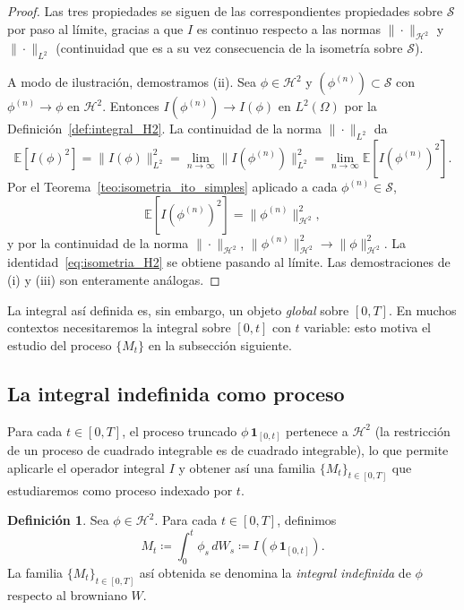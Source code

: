 \documentclass[11pt,a4paper,oneside]{report}
\theoremstyle{plain}
\theoremstyle{definition}
\newtheorem{definicion}[teorema]{Definición}
\theoremstyle{remark}
\newcommand{\E}{\mathbb{E}}
\newcommand{\1}{\mathbf{1}}
\newcommand{\eqdef}{\coloneqq}
\begin{document}
\begin{proof}
Las tres propiedades se siguen de las correspondientes propiedades
sobre $\mathcal{S}$ por paso al límite, gracias a que $I$ es continuo
respecto a las normas $\|\cdot\|_{\mathcal{H}^2}$ y $\|\cdot\|_{L^2}$
(continuidad que es a su vez consecuencia de la isometría sobre
$\mathcal{S}$).

A modo de ilustración, demostramos (ii). Sea $\phi \in \mathcal{H}^2$
y $(\phi^{(n)}) \subset \mathcal{S}$ con $\phi^{(n)} \to \phi$ en
$\mathcal{H}^2$. Entonces $I(\phi^{(n)}) \to I(\phi)$ en $L^2(\Omega)$
por la Definición~\ref{def:integral_H2}. La continuidad de la norma
$\|\cdot\|_{L^2}$ da
\begin{equation*}
  \E[I(\phi)^2]
  = \|I(\phi)\|_{L^2}^2
  = \lim_{n\to\infty} \|I(\phi^{(n)})\|_{L^2}^2
  = \lim_{n\to\infty} \E[I(\phi^{(n)})^2].
\end{equation*}
Por el Teorema~\ref{teo:isometria_ito_simples} aplicado a cada
$\phi^{(n)} \in \mathcal{S}$,
\begin{equation*}
  \E[I(\phi^{(n)})^2] = \|\phi^{(n)}\|_{\mathcal{H}^2}^2,
\end{equation*}
y por la continuidad de la norma $\|\cdot\|_{\mathcal{H}^2}$,
$\|\phi^{(n)}\|_{\mathcal{H}^2}^2 \to \|\phi\|_{\mathcal{H}^2}^2$. La
identidad~\eqref{eq:isometria_H2} se obtiene pasando al límite. Las
demostraciones de (i) y (iii) son enteramente análogas.
\end{proof}

La integral así definida es, sin embargo, un objeto \emph{global}
sobre $[0, T]$. En muchos contextos necesitaremos la integral sobre
$[0, t]$ con $t$ variable: esto motiva el estudio del proceso $\{M_t\}$
en la subsección siguiente.

\subsection{La integral indefinida como proceso}
\label{subsec:integral_indefinida}

Para cada $t \in [0, T]$, el proceso truncado $\phi\, \mathbf{1}_{[0,
t]}$ pertenece a $\mathcal{H}^2$ (la restricción de un proceso de
cuadrado integrable es de cuadrado integrable), lo que permite
aplicarle el operador integral $I$ y obtener así una familia
$\{M_t\}_{t \in [0, T]}$ que estudiaremos como proceso indexado por
$t$.

\begin{definicion}
\label{def:integral_indefinida}
Sea $\phi \in \mathcal{H}^2$. Para cada $t \in [0, T]$, definimos
\begin{equation}\label{eq:def_integral_indefinida}
  M_t \eqdef \int_0^t \phi_s\, dW_s
        \eqdef I\!\left(\phi\, \mathbf{1}_{[0, t]}\right).
\end{equation}
La familia $\{M_t\}_{t \in [0, T]}$ así obtenida se denomina la
\emph{integral indefinida} de $\phi$ respecto al browniano $W$.
\end{definicion}
\end{document}
